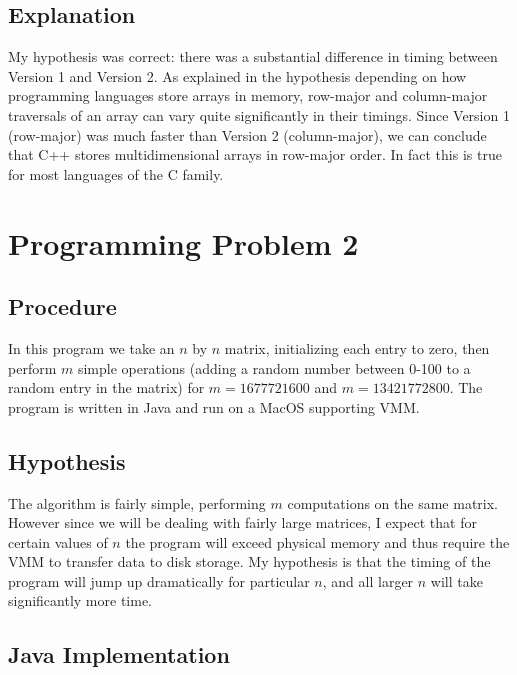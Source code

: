 \documentclass[11pt]{article}
\begin{document}
\subsection*{Explanation}

My hypothesis was correct: there was a substantial difference in timing between Version 1 and Version 2. As explained in the hypothesis depending on how programming languages store arrays in memory, row-major and column-major traversals of an array can vary quite significantly in their timings. Since Version 1 (row-major) was much faster than Version 2 (column-major), we can conclude that C++ stores multidimensional arrays in row-major order. In fact this is true for most languages of the C family.

\section*{Programming Problem 2}

\subsection*{Procedure}

In this program we take an $n$ by $n$ matrix, initializing each entry to zero, then perform $m$ simple operations (adding a random number between 0-100 to a random entry in the matrix) for $m = 1677721600$ and $m = 13421772800$. The program is written in Java and run on a MacOS supporting VMM.

\subsection*{Hypothesis}

The algorithm is fairly simple, performing $m$ computations on the same matrix. However since we will be dealing with fairly large matrices, I expect that for certain values of $n$ the program will exceed physical memory and thus require the VMM to transfer data to disk storage. My hypothesis is that the timing of the program will jump up dramatically for particular $n$, and all larger $n$ will take significantly more time.

\subsection*{Java Implementation}
\end{document}
